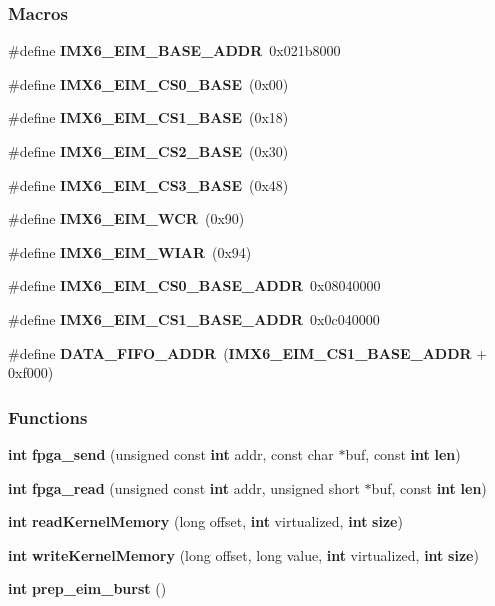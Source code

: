 \subsubsection*{Macros}
\begin{DoxyCompactItemize}
\item 
\#define {\bf I\+M\+X6\+\_\+\+E\+I\+M\+\_\+\+B\+A\+S\+E\+\_\+\+A\+D\+DR}~0x021b8000
\item 
\#define {\bf I\+M\+X6\+\_\+\+E\+I\+M\+\_\+\+C\+S0\+\_\+\+B\+A\+SE}~(0x00)
\item 
\#define {\bf I\+M\+X6\+\_\+\+E\+I\+M\+\_\+\+C\+S1\+\_\+\+B\+A\+SE}~(0x18)
\item 
\#define {\bf I\+M\+X6\+\_\+\+E\+I\+M\+\_\+\+C\+S2\+\_\+\+B\+A\+SE}~(0x30)
\item 
\#define {\bf I\+M\+X6\+\_\+\+E\+I\+M\+\_\+\+C\+S3\+\_\+\+B\+A\+SE}~(0x48)
\item 
\#define {\bf I\+M\+X6\+\_\+\+E\+I\+M\+\_\+\+W\+CR}~(0x90)
\item 
\#define {\bf I\+M\+X6\+\_\+\+E\+I\+M\+\_\+\+W\+I\+AR}~(0x94)
\item 
\#define {\bf I\+M\+X6\+\_\+\+E\+I\+M\+\_\+\+C\+S0\+\_\+\+B\+A\+S\+E\+\_\+\+A\+D\+DR}~0x08040000
\item 
\#define {\bf I\+M\+X6\+\_\+\+E\+I\+M\+\_\+\+C\+S1\+\_\+\+B\+A\+S\+E\+\_\+\+A\+D\+DR}~0x0c040000
\item 
\#define {\bf D\+A\+T\+A\+\_\+\+F\+I\+F\+O\+\_\+\+A\+D\+DR}~({\bf I\+M\+X6\+\_\+\+E\+I\+M\+\_\+\+C\+S1\+\_\+\+B\+A\+S\+E\+\_\+\+A\+D\+DR} + 0xf000)
\end{DoxyCompactItemize}
\subsubsection*{Functions}
\begin{DoxyCompactItemize}
\item 
{\bf int} {\bf fpga\+\_\+send} (unsigned const {\bf int} addr, const char $\ast$buf, const {\bf int} {\bf len})
\item 
{\bf int} {\bf fpga\+\_\+read} (unsigned const {\bf int} addr, unsigned short $\ast$buf, const {\bf int} {\bf len})
\item 
{\bf int} {\bf read\+Kernel\+Memory} (long offset, {\bf int} virtualized, {\bf int} {\bf size})
\item 
{\bf int} {\bf write\+Kernel\+Memory} (long offset, long value, {\bf int} virtualized, {\bf int} {\bf size})
\item 
{\bf int} {\bf prep\+\_\+eim\+\_\+burst} ()
\end{DoxyCompactItemize}
